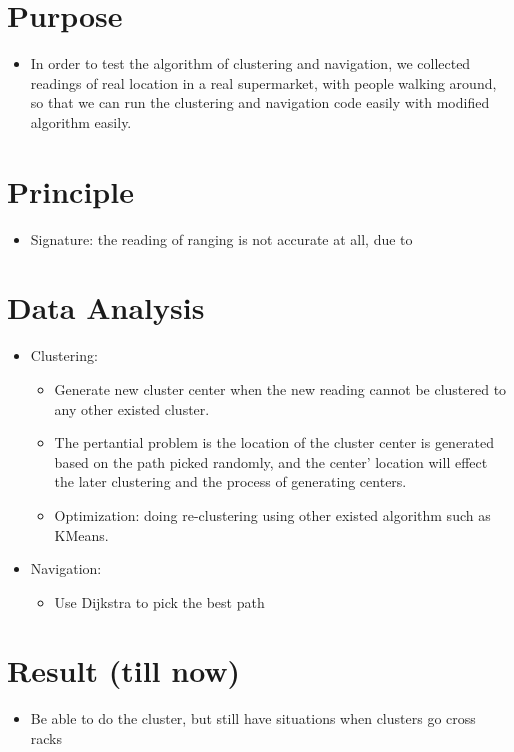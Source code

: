 \documentclass{article}
\begin{document}
\section{Purpose}
\begin{itemize}
\item In order to test the algorithm of clustering and navigation, we collected readings of real location in a real supermarket, with people walking around, so that we can run the clustering and navigation code easily with modified algorithm easily.
\end{itemize}

\section{Principle}
\begin{itemize}
\item Signature: the reading of ranging is not accurate at all, due to 
\end{itemize}

\section{Data Analysis}
\begin{itemize}
\item Clustering: 
	\begin{itemize}
	\item Generate new cluster center when the new reading cannot be clustered to any other existed cluster.
	\item The pertantial problem is the location of the cluster center is generated based on the path picked randomly, and the center' location will effect the later clustering and the process of generating centers.
	\item Optimization: doing re-clustering using other existed algorithm such as KMeans.
	\end{itemize}
\item Navigation: 
	\begin{itemize}
	\item Use Dijkstra to pick the best path
	\end{itemize}
\end{itemize}

\section{Result (till now)}
\begin{itemize}
\item Be able to do the cluster, but still have situations when clusters go cross racks
\end{itemize}
\end{document}
